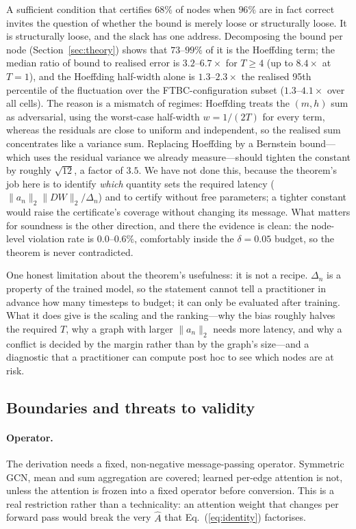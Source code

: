 \documentclass[10pt,twocolumn]{article}
\newcommand{\Ahat}{\hat{A}}
\newcommand{\anorm}{\lVert a_{n}\rVert_{2}}
\newcommand{\Deltan}{\Delta_{n}}
\newcommand{\secref}[1]{Section~\ref{#1}}
\newcommand{\eqnref}[1]{Eq.~(\ref{#1})}
\begin{document}
A sufficient condition that certifies $68\%$ of nodes when $96\%$ are in fact correct invites the
question of whether the bound is merely loose or structurally loose. It is structurally loose, and
the slack has one address. Decomposing the bound per node (\secref{sec:theory}) shows that
$73$--$99\%$ of it is the Hoeffding term; the median ratio of bound to realised error is
$3.2$--$6.7\times$ for $T \ge 4$ (up to $8.4\times$ at $T=1$), and the Hoeffding half-width alone is
$1.3$--$2.3\times$ the realised 95th percentile of the fluctuation over the FTBC-configuration
subset ($1.3$--$4.1\times$ over all cells). The reason is a mismatch of
regimes: Hoeffding treats the $(m,h)$ sum as adversarial, using the worst-case half-width
$w = 1/(2T)$ for every term, whereas the residuals are close to uniform and independent, so the
realised sum concentrates like a variance sum. Replacing Hoeffding by a Bernstein bound---which uses
the residual variance we already measure---should tighten the constant by roughly $\sqrt{12}$, a
factor of $3.5$. We have not done this, because the theorem's job here is to identify \emph{which}
quantity sets the required latency ($\anorm\lVert DW\rVert_{2}/\Deltan$) and to certify without free
parameters; a tighter constant would raise the certificate's coverage without changing its message.
What matters for soundness is the other direction, and there the evidence is clean: the node-level
violation rate is $0.0$--$0.6\%$, comfortably inside the $\delta = 0.05$ budget, so the theorem is
never contradicted.

One honest limitation about the theorem's usefulness: it is not a recipe. $\Deltan$ is a property of
the trained model, so the statement cannot tell a practitioner in advance how many timesteps to
budget; it can only be evaluated after training. What it does give is the scaling and the ranking---why
the bias roughly halves the required $T$, why a graph with larger $\anorm$ needs more latency, and
why a conflict is decided by the margin rather than by the graph's size---and a diagnostic that a
practitioner can compute post hoc to see which nodes are at risk.

\subsection{Boundaries and threats to validity}
\label{sec:boundaries}

\paragraph{Operator.} The derivation needs a fixed, non-negative message-passing operator. Symmetric
GCN, mean and sum aggregation are covered; learned per-edge attention is not, unless the attention is
frozen into a fixed operator before conversion. This is a real restriction rather than a
technicality: an attention weight that changes per forward pass would break the very $\Ahat$ that
\eqnref{eq:identity} factorises.
\end{document}
